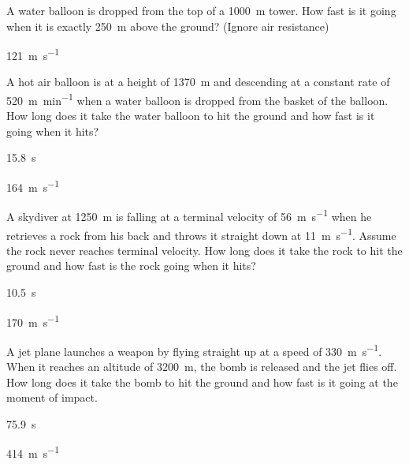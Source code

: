 \begin{question}[ID=falling-B-Q01,topic=kinematics,difficulty=B]
    A water balloon is dropped from the top of a
        \SI{1000}{\meter} tower.
    How fast is it going when it is exactly
        \SI{250}{\meter} above the ground?
    (Ignore air resistance)
\end{question}
\begin{solution}
    \SI{121}{\meter\per\second}
\end{solution}


\begin{question}[ID=falling-B-Q02,topic=kinematics,difficulty=B]
    A hot air balloon is at a height of \SI{1370}{\meter}
        and descending at a constant rate of \SI{520}{\meter\per\minute}
        when a water balloon is dropped from the basket of the balloon.
    How long does it take the water balloon to hit the ground
        and how fast is it going when it hits?
\end{question}
\begin{solution}
    \begin{enumerate*}
        \item \SI{15.8}{\second}
        \item \SI{164}{\meter\per\second}
    \end{enumerate*}
\end{solution}


\begin{question}[ID=falling-B-Q03,topic=kinematics,difficulty=B]
    A skydiver at \SI{1250}{\meter} is falling at a terminal velocity
        of \SI{56}{\meter\per\second} when he retrieves a rock from
        his back and throws it straight down at \SI{11}{\meter\per\second}.
    Assume the rock never reaches terminal velocity.
    How long does it take the rock to hit the ground and how fast
        is the rock going when it hits?
\end{question}
\begin{solution}
    \begin{enumerate*}
        \item \SI{10.5}{\second}
        \item \SI{170}{\meter\per\second}
    \end{enumerate*}
\end{solution}

\begin{question}[ID=falling-B-Q04,topic=kinematics,difficulty=B]
    A jet plane launches a weapon by flying straight up at a speed
        of \SI{330}{\meter\per\second}.
    When it reaches an altitude of \SI{3200}{\meter}, the bomb
        is released and the jet flies off.
    How long does it take the bomb to hit the ground and how
        fast is it going at the moment of impact.
\end{question}
\begin{solution}
    \begin{enumerate*}
        \item \SI{75.9}{\second}
        \item \SI{414}{\meter\per\second}
    \end{enumerate*}
\end{solution}


